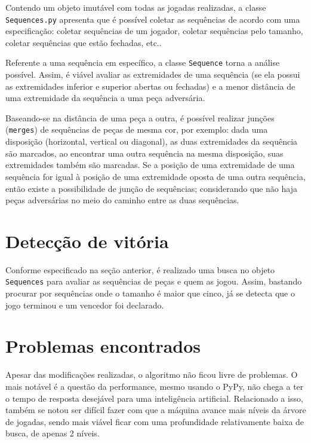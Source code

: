 \documentclass{article}
\begin{document}
        Contendo um objeto imutável com todas as jogadas realizadas, a classe
        \texttt{Sequences.py} apresenta que é possível coletar as sequências de
        acordo com uma especificação: coletar sequências de um jogador, coletar
        sequências pelo tamanho, coletar sequências que estão fechadas, etc..
        
        Referente a uma sequência em específico, a classe \texttt{Sequence}
        torna a análise possível. Assim, é viável avaliar as extremidades de
        uma sequência (se ela possui as extremidades inferior e superior
        abertas ou fechadas) e a menor distância de uma extremidade da
        sequência a uma peça adversária. 
        
        Baseando-se na distância de uma peça a outra, é possível realizar
        junções (\texttt{merges}) de sequências de peças de mesma cor, por
        exemplo: dada uma disposição (horizontal, vertical ou diagonal), as
        duas extremidades da sequência são marcados, ao encontrar uma outra
        sequência na mesma disposição, suas extremidades também são marcadas.
        Se a posição de uma extremidade de uma sequência for igual à posição de
        uma extremidade oposta de uma outra sequência, então existe a
        possibilidade de junção de sequências; considerando que não haja peças
        adversárias no meio do caminho entre as duas sequências.
        
    \section*{Detecção de vitória}
        Conforme especificado na seção anterior, é realizado uma busca no
        objeto \texttt{Sequences} para avaliar as sequências de peças e quem as
        jogou. Assim, bastando procurar por sequências onde o tamanho é maior
        que cinco, já se detecta que o jogo terminou e um vencedor foi
        declarado.
        
    \section*{Problemas encontrados}
        Apesar das modificações realizadas, o algoritmo não ficou livre de
        problemas. O mais notável é a questão da performance, mesmo usando o
        PyPy, não chega a ter o tempo de resposta desejável para uma
        inteligência artificial. Relacionado a isso, também se notou ser
        difícil fazer com que a máquina avance mais níveis da árvore de
        jogadas, sendo mais viável ficar com uma profundidade relativamente
        baixa de busca, de apenas 2 níveis.
\end{document}
